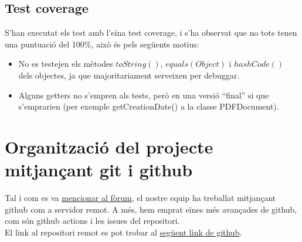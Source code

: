 \documentclass[12pt, letterpaper]{article}
\begin{document}
\subsection{Test coverage}
S'han executat els test amb l'eïna test coverage, i s'ha observat que no tots tenen una puntuació del 100\%, això és pels següents motius:
\begin{itemize}
  \item No es testejen els mètodes $toString()$, $equals(Object)$ i $hashCode()$ dels objectes, ja que majoritariament serveixen per debuggar.
  \item Alguns getters no s'empren als tests, però en una versió ``final'' si que s'emprarien (per exemple getCreationDate() a la classe PDFDocument).
\end{itemize}

\section{Organització del projecte mitjançant git i github}
Tal i com es va  \href{https://cv.udl.cat/portal/site/102018-2122/tool/03e89a2d-c918-41df-84c4-3b8af0591e37/discussionForum/message/dfViewThread}{mencionar al fòrum}, el nostre equip ha treballat mitjançant github com a servidor remot. A més, hem emprat eïnes més avançades de github, com són github actions i les issues del repositori. \\

El link al repositori remot es pot trobar al \href{https://github.com/Pablito2020/Unified-Platform}{següent link de github}.
\end{document}
